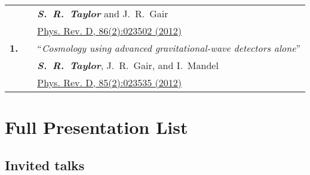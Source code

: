 \documentclass[11pt,letterpaper,sans]{moderncv}
\begin{document}
{\begin{longtable}{rp{0.3cm}p{15.8cm}}
&& \textit{\textbf{S.~R.~Taylor}} and J.~R.~Gair \\ 
&& \href{http://journals.aps.org/prd/abstract/10.1103/PhysRevD.86.023502}{{\color{color1} Phys. Rev. D, 86(2):023502 (2012)}} \vspace{0.09cm}\\
\textbf{1.} & & ``\textit{Cosmology using advanced gravitational-wave detectors alone}'' \\ 
&& \textit{\textbf{S.~R.~Taylor}}, J.~R.~Gair, and I.~Mandel \\ 
&& \href{http://journals.aps.org/prd/abstract/10.1103/PhysRevD.85.023535}{{\color{color1} Phys. Rev. D, 85(2):023535 (2012)}} \vspace{0.09cm}\\
\end{longtable}
}

\pagebreak


\section{Full Presentation List}
\vspace{-0.3cm}
\subsection{Invited talks} \vspace{-0.3cm}
\end{document}
